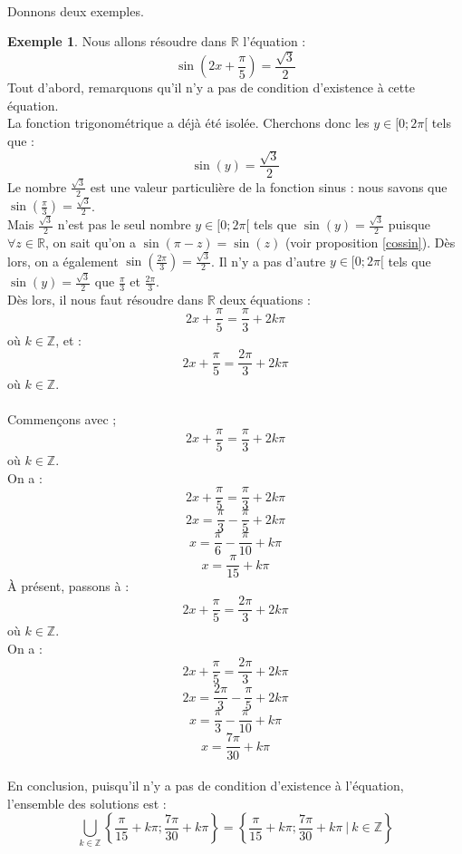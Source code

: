 \documentclass[a4paper,fontsize=13pt]{scrreprt}
\theoremstyle{plain}
\theoremstyle{definition}
\newtheorem{exe}[subsection]{Exemple}
\newcommand{\zz}{\mathbb{Z}}
\newcommand{\rr}{\mathbb{R}}
\begin{document}
~\\
Donnons deux exemples.
\begin{exe}
Nous allons résoudre dans $\rr$ l'équation :
$$ \sin\left(2x+\frac{\pi}{5}\right)=\frac{\sqrt{3}}{2}$$
Tout d'abord, remarquons qu'il n'y a pas de condition d'existence à cette équation.  \\
La fonction trigonométrique a déjà été isolée. Cherchons donc les $y \in [0;2\pi[$ tels que :
$$\sin(y)=\frac{\sqrt{3}}{2}$$
Le nombre $\frac{\sqrt{3}}{2}$ est une valeur particulière de la fonction sinus : nous savons que $\sin(\frac{\pi}{3}) = \frac{\sqrt{3}}{2}$. \\
Mais $\frac{\sqrt{3}}{2}$ n'est pas le seul nombre $y \in [0;2\pi[$ tels que $\sin(y)=\frac{\sqrt{3}}{2}$ puisque $\forall z \in \rr$, on sait qu'on a $\sin(\pi - z) = \sin(z)$ (voir proposition \ref{cossin}). Dès lors, on a également $\sin(\frac{2\pi}{3})=\frac{\sqrt{3}}{2}$. Il n'y a pas d'autre $y \in [0;2\pi[$ tels que $\sin(y)=\frac{\sqrt{3}}{2}$ que $\frac{\pi}{3}$ et $\frac{2\pi}{3}$. \\
Dès lors, il nous faut résoudre dans $\rr$ deux équations :
$$2x+\frac{\pi}{5}=\frac{\pi}{3}+2k\pi$$
où $k \in \zz$, et :
$$2x+\frac{\pi}{5}=\frac{2\pi}{3}+2k\pi$$
où $k \in \zz$. \\
~\\
Commençons avec ;
$$2x+\frac{\pi}{5}=\frac{\pi}{3}+2k\pi$$
où $k \in \zz$. \\
On a :
$$2x+\frac{\pi}{5}=\frac{\pi}{3}+2k\pi$$
$$2x=\frac{\pi}{3}-\frac{\pi}{5}+2k\pi$$
$$x=\frac{\pi}{6}-\frac{\pi}{10}+k\pi$$
$$x=\frac{\pi}{15}+k\pi$$
\newpage
\`A présent, passons à :
$$2x+\frac{\pi}{5}=\frac{2\pi}{3}+2k\pi$$
où $k \in \zz$. \\
On a :
$$2x+\frac{\pi}{5}=\frac{2\pi}{3}+2k\pi$$
$$2x=\frac{2\pi}{3}-\frac{\pi}{5}+2k\pi$$
$$x=\frac{\pi}{3}-\frac{\pi}{10}+k\pi$$
$$x=\frac{7\pi}{30}+k\pi$$
~\\
En conclusion, puisqu'il n'y a pas de condition d'existence à l'équation, l'ensemble des solutions est :
$$\underset{k\in\zz}\bigcup \left\{\frac{\pi}{15}+k\pi ; \frac{7\pi}{30}+k\pi \right\} = \left\{\frac{\pi}{15}+k\pi ; \frac{7\pi}{30}+k\pi ~|~ k \in \zz \right\}$$
\end{exe}
~\\
\end{document}
